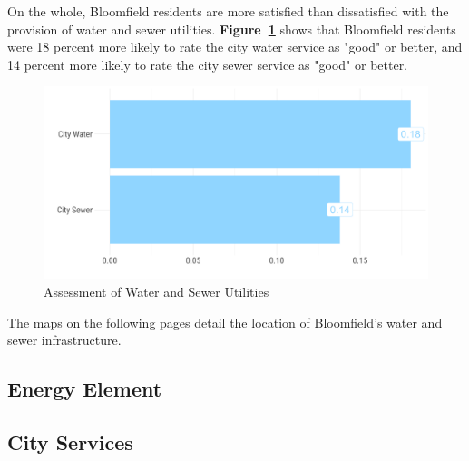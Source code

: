\pagebreak
\noindent On the whole, Bloomfield residents are more satisfied than dissatisfied with the provision of water and sewer utilities. \textbf{Figure~\ref{fig:scoreWaterSewer}} shows that Bloomfield residents were 18 percent more likely to rate the city water service as "good" or better, and 14 percent more likely to rate the city sewer service as "good" or better.

\begin{figure}[H]
\centering
\begin{framed}
    \caption{Assessment of Water and Sewer Utilities}
    \label{fig:scoreWaterSewer}
    \includegraphics[width = \linewidth]{figures/score_water_sewer.png}
\end{framed}
\end{figure}

\noindent The maps on the following pages detail the location of Bloomfield's water and sewer infrastructure.

\pagebreak
\thispagestyle{empty}
\begin{landscape}
    
\end{landscape}

\pagebreak
\thispagestyle{empty}
\begin{landscape}
    
\end{landscape}

\pagebreak
\subsection{Energy Element}

\pagebreak
\subsection{City Services}

